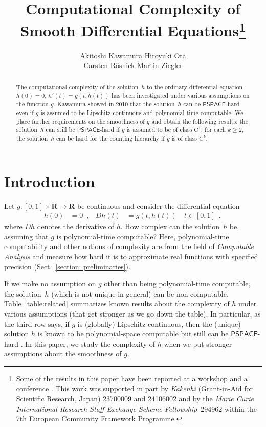 \documentclass[12pt,a4paper]{article}
\title{Computational Complexity of\\Smooth Differential Equations\footnote{%
Some of the results in this paper have been reported at a workshop and a conference
\cite{eatcs-la, mfcs}. 
This work was supported in part 
by \emph{Kakenhi} (Grant-in-Aid for Scientific Research, Japan) 23700009 and 24106002
and by the \emph{Marie Curie International Research
Staff Exchange Scheme Fellowship}~294962
within the 7th European Community Framework Programme. }}
\author{%
Akitoshi Kawamura
\hspace{1.7em}
Hiroyuki Ota 
\\
Carsten R\"osnick
\hspace{2.75em}
Martin Ziegler
}
\theoremstyle{definition}
\theoremstyle{remark}
\newcommand{\R}{\mathbf R}
\newcommand{\D}{D}
\newcommand{\classPSPACE}{\mathsf{PSPACE}}
\newcommand{\classC}{\mathrm C}
\begin{document}
\maketitle

\begin{abstract}
The computational complexity of the solution~$h$ to 
the ordinary differential equation 
$h(0)=0$, $h'(t) = g(t, h(t))$ 
has been investigated
under various assumptions on the function $g$. 
Kawamura showed in 2010 that the solution~$h$ can be $\classPSPACE$-hard
even if $g$ is assumed to be Lipschitz continuous and polynomial-time computable. 
We place further requirements on the smoothness of $g$ 
and obtain the following results: 
the solution~$h$ can still be $\classPSPACE$-hard
if $g$ is assumed to be of class $\classC ^1$; 
for each $k \geq 2$, 
the solution~$h$ can be hard for the counting hierarchy 
if $g$ is of class $\classC ^k$. 
\end{abstract}

\section{Introduction}

Let $g \colon [0,1] \times \R \to \R$ be continuous 
and consider the differential equation 
\begin{align}
 \label{eq:ode}
 h(0) & = 0 \enspace , &
 \D h(t) & = g(t,h(t)) \quad t \in [0,1] \enspace , 
\end{align}
where $\D h$ denotes the derivative of $h$. 
How complex can the solution~$h$ be, 
assuming that $g$ is polynomial-time computable? 
Here, polynomial-time computability 
and other notions of complexity 
are from the field of 
\emph{Computable Analysis} 
\cite{ko1991complexity,weihrauch00:_comput_analy}
and measure how hard it is to 
approximate real functions with specified precision 
(Sect.~\ref{section: preliminaries}). 

If we make no assumption on $g$ other than being polynomial-time computable, 
the solution~$h$ (which is not unique in general) can be non-computable. 
Table~\ref{table:related} summarizes known results about 
the complexity of $h$ under various assumptions 
(that get stronger as we go down the table). 
In particular, 
as the third row says, 
if $g$ is (globally) Lipschitz continuous, 
then the (unique) solution $h$ is known to be 
polynomial-space computable but still can be 
$\classPSPACE$-hard \cite{kawamura2010lipschitz}. 
In this paper, we study the complexity of $h$ 
when we put stronger assumptions about 
the smoothness of $g$. 
\end{document}
